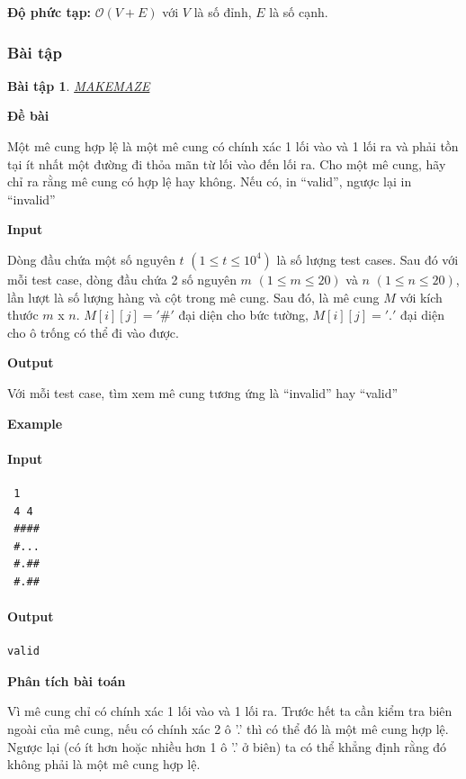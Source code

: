 \documentclass{article}
\newtheorem{baitap}{Bài tập}
\begin{document}
\textbf{Độ phức tạp: } $\mathcal{O}(V + E)$ với $V$ là số đỉnh, $E$ là số cạnh.

\subsubsection{Bài tập}
\begin{baitap}    
    \href{https://www.spoj.com/problems/MAKEMAZE/}{MAKEMAZE}
\end{baitap} 

\textbf{Đề bài}

Một mê cung hợp lệ là một mê cung có chính xác 1 lối vào và 1 lối ra  và phải tồn tại ít nhất một đường đi thỏa mãn từ lối vào đến lối ra. Cho một mê cung, hãy chỉ ra rằng mê cung có hợp lệ hay không. Nếu có, in ``valid'', ngược lại in ``invalid''

\textbf{Input}

Dòng đầu chứa một số nguyên $t$ $(1 \leq t \leq 10^4)$ là số lượng test cases. Sau đó với mỗi test case, dòng đầu chứa 2 số nguyên $m$ $(1 \leq m \leq 20)$ và $n$ $(1 \leq n \leq 20)$, lần lượt là số lượng hàng và cột trong mê cung. Sau đó, là mê cung $M$ với kích thước $m$ x $n$. $M[i][j] = '\#'$ đại diện cho bức tường, $M[i][j] = '.'$ đại diện cho ô trống có thể đi vào được.

\textbf{Output}

Với mỗi test case, tìm xem mê cung tương ứng là ``invalid'' hay ``valid''

\textbf{Example}

\paragraph{Input}
\begin{lstlisting}
 1
 4 4 
 ####
 #...  
 #.## 
 #.## 
\end{lstlisting}

\paragraph{Output}
\begin{lstlisting}
valid
\end{lstlisting}


\textbf{Phân tích bài toán}

Vì mê cung chỉ có chính xác 1 lối vào và 1 lối ra. Trước hết ta cần kiểm tra biên ngoài của mê cung, nếu có chính xác 2 ô '.' thì có thể đó là một mê cung hợp lệ. Ngược lại (có ít hơn hoặc nhiều hơn 1 ô '.' ở biên) ta có thể khẳng định rằng đó không phải là một mê cung hợp lệ. \\
\end{document}
